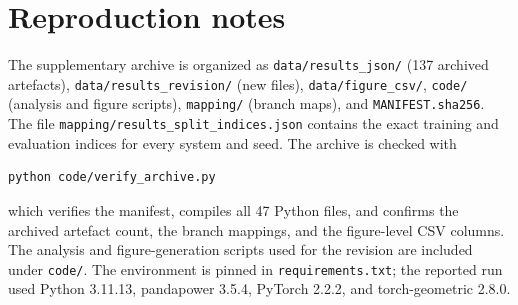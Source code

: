 \section{Reproduction notes}\label{appendix:reproduction}

The supplementary archive is organized as \texttt{data/results\_json/} (137 archived artefacts), \texttt{data/results\_revision/} (new files), \texttt{data/figure\_csv/}, \texttt{code/} (analysis and figure scripts), \texttt{mapping/} (branch maps), and \texttt{MANIFEST.sha256}. The file \texttt{mapping/results\_split\_indices.json} contains the exact training and evaluation indices for every system and seed. The archive is checked with
\begin{verbatim}
python code/verify_archive.py
\end{verbatim}
which verifies the manifest, compiles all 47 Python files, and confirms the archived artefact count, the branch mappings, and the figure-level CSV columns. The analysis and figure-generation scripts used for the revision are included under \texttt{code/}. The environment is pinned in \texttt{requirements.txt}; the reported run used Python 3.11.13, pandapower 3.5.4, PyTorch 2.2.2, and torch-geometric 2.8.0.
